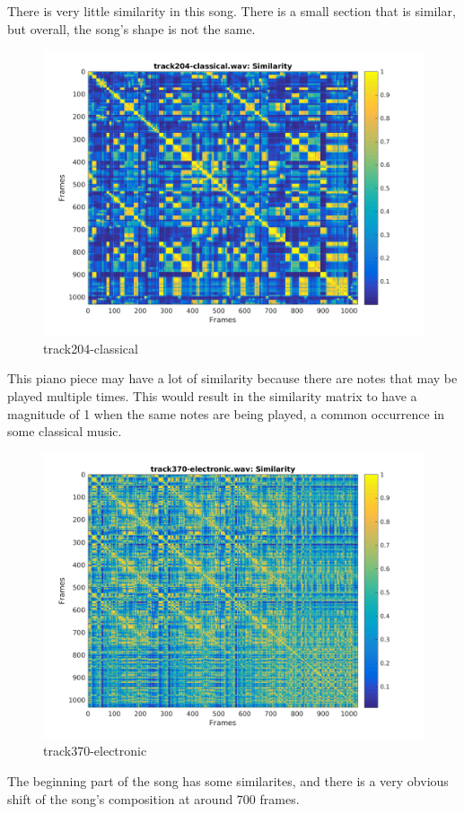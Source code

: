 \documentclass[11pt, a4paper]{article}
\begin{document}
There is very little similarity in this song. There is a small section that is similar, but overall, the song's shape is not the same.

\begin{figure}[H]
    \centering
    \includegraphics[width=.8\textwidth]{track204-classical-similarity.png}
    \caption{track204-classical}
\end{figure}

This piano piece may have a lot of similarity because there are notes that may be played multiple times. This would result in the similarity matrix to have a magnitude of 1 when the same notes are being played, a common occurrence in some classical music. 	


\begin{figure}[H]
    \centering
    \includegraphics[width=.8\textwidth]{track370-electronic-similarity.png}
    \caption{track370-electronic}
\end{figure}

The beginning part of the song has some similarites, and there is a very obvious shift of the song's composition at around 700 frames.
\end{document}
